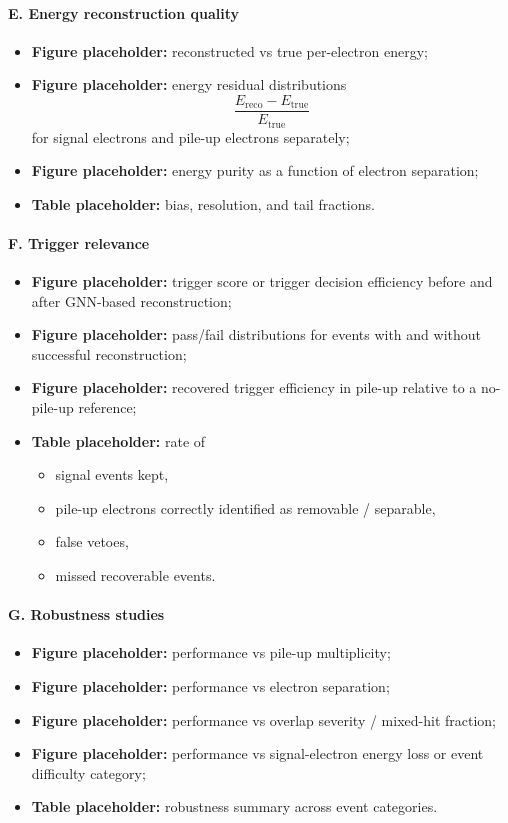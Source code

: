\paragraph{E. Energy reconstruction quality}
\begin{itemize}
    \item \textbf{Figure placeholder:} reconstructed vs true per-electron energy;
    \item \textbf{Figure placeholder:} energy residual distributions
    \[
        \frac{E_{\mathrm{reco}} - E_{\mathrm{true}}}{E_{\mathrm{true}}}
    \]
    for signal electrons and pile-up electrons separately;
    \item \textbf{Figure placeholder:} energy purity as a function of electron separation;
    \item \textbf{Table placeholder:} bias, resolution, and tail fractions.
\end{itemize}

\paragraph{F. Trigger relevance}
\begin{itemize}
    \item \textbf{Figure placeholder:} trigger score or trigger decision efficiency before and after GNN-based reconstruction;
    \item \textbf{Figure placeholder:} pass/fail distributions for events with and without successful reconstruction;
    \item \textbf{Figure placeholder:} recovered trigger efficiency in pile-up relative to a no-pile-up reference;
    \item \textbf{Table placeholder:} rate of
    \begin{itemize}
        \item signal events kept,
        \item pile-up electrons correctly identified as removable / separable,
        \item false vetoes,
        \item missed recoverable events.
    \end{itemize}
\end{itemize}

\paragraph{G. Robustness studies}
\begin{itemize}
    \item \textbf{Figure placeholder:} performance vs pile-up multiplicity;
    \item \textbf{Figure placeholder:} performance vs electron separation;
    \item \textbf{Figure placeholder:} performance vs overlap severity / mixed-hit fraction;
    \item \textbf{Figure placeholder:} performance vs signal-electron energy loss or event difficulty category;
    \item \textbf{Table placeholder:} robustness summary across event categories.
\end{itemize}

